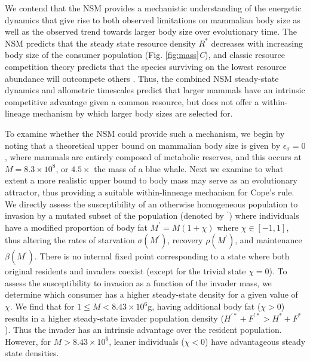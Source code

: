 \documentclass{pnastwo}
\newcommand{\sid}[1]{\textcolor{red}{\bf [#1]}}
\begin{document}
\begin{article}


We contend that the NSM provides a mechanistic understanding of the energetic dynamics that give rise to both observed limitations on mammalian body size as well as the observed trend towards larger body size over evolutionary time.
The NSM predicts that the steady state resource density $R^{*}$ decreases with increasing body size of the consumer population (Fig. \ref{fig:mass}\emph{C}), and classic resource competition theory predicts that the species surviving on the lowest resource abundance will outcompete others \cite{tilman1981,dutkiewicz2009,barton2010}. 
Thus, the combined NSM steady-state dynamics and allometric timescales predict that larger mammals have an intrinsic competitive advantage given a common resource, but does not offer a within-lineage mechanism by which larger body sizes are selected for.

To examine whether the NSM could provide such a mechanism, we begin by noting that a theoretical upper bound on mammalian body size is given by $\epsilon_\sigma=0$, where mammals are entirely composed of metabolic reserves, and this occurs at $M=8.3\times 10^8$, or $4.5\times$ the mass of a blue whale.
Next we examine to what extent a more realistic upper bound to body mass may serve as an evolutionary attractor, thus providing a suitable within-linneage mechanism for Cope's rule. 
We directly assess the susceptibility of an otherwise homogeneous population to invasion by a mutated subset of the population (denoted by ${}^\prime$) where individuals have a modified proportion of body fat $M^\prime=M(1+\chi)$ where $\chi \in [-1,1]$, thus altering the rates of starvation $\sigma(M^\prime)$, recovery $\rho(M^\prime)$, and maintenance $\beta(M^\prime)$.  
There is no internal fixed point corresponding to a state where both original residents and invaders coexist (except for the trivial state $\chi=0$).  
To assess the susceptibility to invasion as a function of the invader mass, we determine which consumer has a higher steady-state density for a given value of $\chi$.  
We find that for $1\leq M<8.43\times 10^6$g, having additional body fat ($\chi > 0$) results in a higher steady-state invader population density ($H^{\prime *}+F^{\prime *}>H^*+F^*$).  
Thus the invader has an intrinsic advantage over the resident population.  
However, for $M>8.43\times 10^6$, leaner individuals ($\chi < 0$) have advantageous steady state densities.


\end{article}
\end{document}
